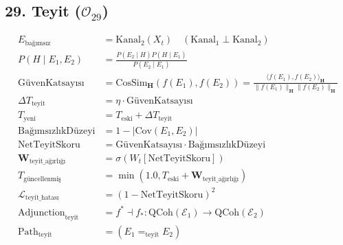 \documentclass[11pt, a4paper]{article}
\begin{document}
\subsection{29. Teyit ($\mathcal{O}_{29}$)}
\begin{align}
E_{\text{bağımsız}} &= \text{Kanal}_2(X_t) \quad (\text{Kanal}_1 \perp \text{Kanal}_2) \\
P(H \mid E_1, E_2) &= \frac{P(E_2 \mid H) P(H \mid E_1)}{P(E_2 \mid E_1)} \\
\text{GüvenKatsayısı} &= \text{CosSim}_{\mathbf{H}}(f(E_1), f(E_2)) = \frac{\langle f(E_1), f(E_2) \rangle_{\mathbf{H}}}{\|f(E_1)\|_{\mathbf{H}} \|f(E_2)\|_{\mathbf{H}}} \\
\Delta T_{\text{teyit}} &= \eta \cdot \text{GüvenKatsayısı} \\
T_{\text{yeni}} &= T_{\text{eski}} + \Delta T_{\text{teyit}} \\
\text{BağımsızlıkDüzeyi} &= 1 - |\text{Cov}(E_1, E_2)| \\
\text{NetTeyitSkoru} &= \text{GüvenKatsayısı} \cdot \text{BağımsızlıkDüzeyi} \\
\mathbf{W}_{\text{teyit\_ağırlığı}} &= \sigma(W_t [\text{NetTeyitSkoru}]) \\
T_{\text{güncellenmiş}} &= \min(1.0, T_{\text{eski}} + \mathbf{W}_{\text{teyit\_ağırlığı}}) \\
\mathcal{L}_{\text{teyit\_hatası}} &= (1 - \text{NetTeyitSkoru})^2 \\
\text{Adjunction}_{\text{teyit}} &= f^* \dashv f_* : \text{QCoh}(\mathcal{E}_1) \to \text{QCoh}(\mathcal{E}_2) \\
\text{Path}_{\text{teyit}} &= (E_1 =_{\text{teyit}} E_2)
\end{align}
\end{document}

